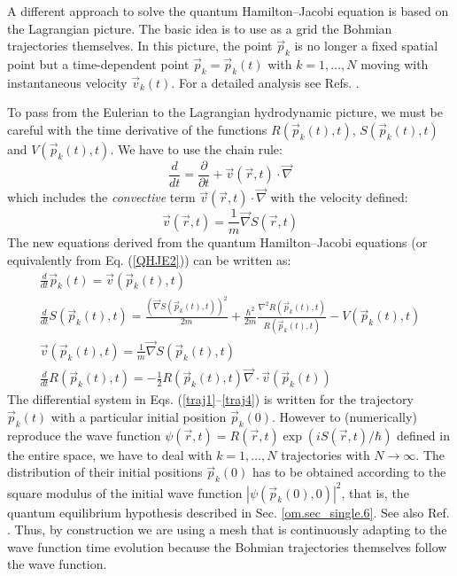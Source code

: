 \documentclass[onecolumn,nofootinbib, secnumarabic, amsmath, nobibnotes,12pt,aps,pra]{revtex4-1}
\newcommand{\sref}[1]{Sec. \ref{#1}}
\newcommand{\eref}[1]{Eq. (\ref{#1})}
\begin{document}
A different approach to solve the quantum Hamilton--Jacobi equation
is based on the Lagrangian picture. The basic idea is to use as a
grid the Bohmian trajectories themselves. In this picture, the point
$\vec{p}_k$ is no longer a fixed spatial point but a time-dependent
point $\vec{p}_k = \vec{p}_k(t)$ with $k = 1,\ldots,N$ moving with
instantaneous velocity $\vec{v}_k(t)$. For a detailed analysis see
Refs. \cite{om.Wyatt1, om.Wyatt2, om.Wyatt3, om.Frederick}.

To pass from the Eulerian to the Lagrangian hydrodynamic picture, we
must  be careful with the time derivative of the functions
$R(\vec{p}_{k}(t),t)$, $S(\vec{p}_{k}(t),t)$ and
$V(\vec{p}_{k}(t),t)$. We have to use the chain rule:
\begin{equation}
\frac{d}{dt} = \frac{\partial}{\partial t} + \vec v(\vec r,t)\cdot\vec{\nabla}
\end{equation}
which includes the \textit{convective} term \textit{$\vec{v}(\vec r,t)\cdot\vec{\nabla}$} with the velocity defined:
\begin{equation}
\vec{v}(\vec r,t) = \frac{1}{m}\vec{\nabla} S(\vec r,t)
\end{equation}
The new equations derived from the quantum Hamilton--Jacobi equations (or equivalently from \eref{QHJE2}) can be written as:
\begin{gather}
\frac{d}{dt}\vec{p}_k(t) = \vec{v}(\vec{p}_k(t),t)\label{traj1}\\[0.1in]
\frac{d}{dt}S(\vec{p}_k(t),t) = \frac{(\vec{\nabla} S(\vec{p}_k(t),t))^{2}}{2m} + \frac{\hbar^{2}%
}{2m}\frac{\nabla^{2}R(\vec{p}_k(t),t)}{R(\vec{p}_k(t),t)} - V(\vec{p}_k(t),t)\label{traj2}\\[0.1in]
\vec{v}(\vec{p}_k(t),t) = \frac{1}{m}\vec{\nabla} S(\vec{p}_k(t),t)\label{traj3}\\[0.1in]
\frac{d}{dt}R(\vec{p}_k(t),t) = -\frac{1}{2}R(\vec{p}_k(t),t)\vec{\nabla}\cdot\vec{v}(\vec
{p}_k(t))\label{traj4}%
\end{gather}
The differential system in Eqs. (\ref{traj1}--\ref{traj4}) is written for the trajectory $\vec{p}_k(t)$ with a particular initial position $\vec{p}_k(0)$. However to (numerically) reproduce the wave function $\psi(\vec r,t) = R(\vec r,t)\exp(iS(\vec r,t)/\hbar)$ defined in the entire space, we have to deal with $k = 1,\ldots,N$ trajectories with $N\rightarrow\infty$. The distribution of their initial positions $\vec{p}_k(0)$ has to be obtained according to the square modulus of the initial wave function $|\psi(\vec p_k(0),0)|^2$, that is, the quantum equilibrium hypothesis described in \sref{om.sec_single.6}. See also Ref. \cite{om.Holand1993}. Thus, by construction we are using a mesh that is continuously adapting to the wave function time evolution because the Bohmian trajectories themselves follow the wave function.
\end{document}
